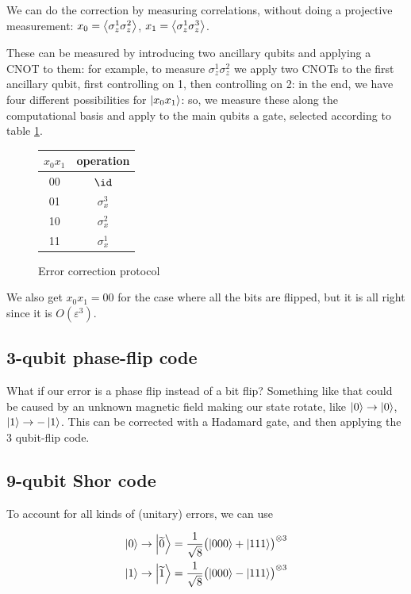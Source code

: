\documentclass[main.tex]{subfiles}
\begin{document}
We can do the correction by measuring correlations, without doing a projective measurement: \(x_0 = \expval{\sigma_z^1 \sigma_z^2}\), \(x_1 = \expval{\sigma_z^1 \sigma_z^3}\).

These can be measured by introducing two ancillary qubits and applying a CNOT to them: for example, to measure \(\sigma_z^1 \sigma_z^2\) we apply two CNOTs to the first ancillary qubit, first controlling on 1, then controlling on 2: in the end, we have four different possibilities for \(\ket{x_0x_1}\): so, we measure these along the computational basis and apply to the main qubits a gate, selected according to table \ref{fig:error-correction-protocol}.

\begin{figure}[H]
    \centering
    \begin{tabular}{c|c}
        \(x_0 x_1\) & operation \\
        \hline
        00 & \(\id\) \\
        01 & \(\sigma_x^3\) \\
        10 & \(\sigma_x^2\) \\
        11 & \(\sigma_x^1\) \\
    \end{tabular}
    \caption{Error correction protocol}
    \label{fig:error-correction-protocol}
\end{figure}

We also get \(x_0 x_1 = 00\) for the case where all the bits are flipped, but it is all right since it is \(O(\varepsilon^3)\).

\subsection{3-qubit phase-flip code}

What if our error is a phase flip  instead of a bit flip? Something like that could be caused by an unknown magnetic field making our state rotate, like \(\ket{0} \rightarrow \ket{0}\), \(\ket{1} \rightarrow -\ket{1}\).
This can be corrected with a Hadamard gate, and then applying the 3 qubit-flip code.

\subsection{9-qubit Shor code}

To account for all kinds of (unitary) errors, we can use

\begin{subequations}
\begin{align}
  \ket{0} &\rightarrow \ket{\widetilde{0}} = \frac{1}{\sqrt{8}} \qty(\ket{000} + \ket{111}) ^{\otimes 3} \\
  \ket{1} &\rightarrow \ket{\widetilde{1}} = \frac{1}{\sqrt{8}} \qty(\ket{000} - \ket{111}) ^{\otimes 3}
\end{align}
\end{subequations}
\end{document}
